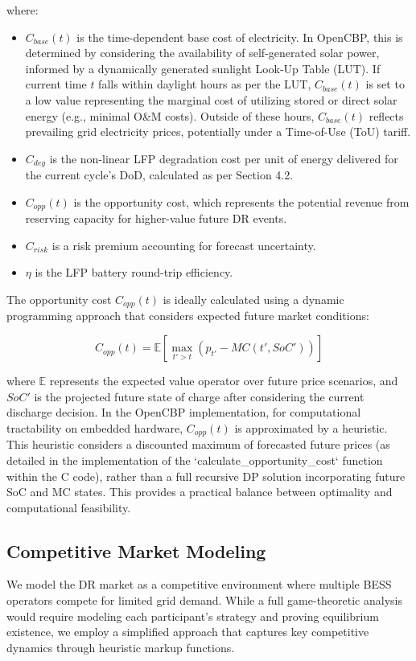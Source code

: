 \documentclass[11pt,a4paper]{article}
\begin{document}
where:
\begin{itemize}
    \item $C_{base}(t)$ is the time-dependent base cost of electricity. In OpenCBP, this is determined by considering the availability of self-generated solar power, informed by a dynamically generated sunlight Look-Up Table (LUT). If current time $t$ falls within daylight hours as per the LUT, $C_{base}(t)$ is set to a low value representing the marginal cost of utilizing stored or direct solar energy (e.g., minimal O\&M costs). Outside of these hours, $C_{base}(t)$ reflects prevailing grid electricity prices, potentially under a Time-of-Use (ToU) tariff.
    \item $C_{deg}$ is the non-linear LFP degradation cost per unit of energy delivered for the current cycle's DoD, calculated as per Section 4.2.
    \item $C_{opp}(t)$ is the opportunity cost, which represents the potential revenue from reserving capacity for higher-value future DR events.
    \item $C_{risk}$ is a risk premium accounting for forecast uncertainty.
    \item $\eta$ is the LFP battery round-trip efficiency.
\end{itemize}

The opportunity cost $C_{opp}(t)$ is ideally calculated using a dynamic programming approach that considers expected future market conditions:

\begin{equation}
C_{opp}(t) = \mathbb{E}\left[ \max_{t' > t} (p_{t'} - MC(t', SoC')) \right]
\end{equation}

where $\mathbb{E}$ represents the expected value operator over future price scenarios, and $SoC'$ is the projected future state of charge after considering the current discharge decision. In the OpenCBP implementation, for computational tractability on embedded hardware, $C_{opp}(t)$ is approximated by a heuristic. This heuristic considers a discounted maximum of forecasted future prices (as detailed in the implementation of the `calculate_opportunity_cost` function within the C code), rather than a full recursive DP solution incorporating future SoC and MC states. This provides a practical balance between optimality and computational feasibility.

\subsection{Competitive Market Modeling}
We model the DR market as a competitive environment where multiple BESS operators compete for limited grid demand. While a full game-theoretic analysis would require modeling each participant's strategy and proving equilibrium existence, we employ a simplified approach that captures key competitive dynamics through heuristic markup functions.
\end{document}
